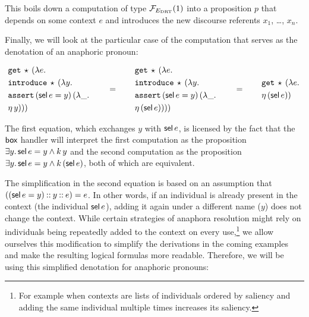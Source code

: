 This boils down a computation of type $\mathcal{F}_{E_{\mathrm{DRT}}}(1)$ into a proposition
$p$ that depends on some context $e$ and introduces the new discourse
referents $x_1$, \ldots, $x_n$.

Finally, we will look at the particular case of the computation that serves
as the denotation of an anaphoric pronoun:

$$
  \begin{aligned}
   &\mathtt{get}\,\star\,(\lambda e.\,  \\
   &\mathtt{introduce}\,\star\,(\lambda y.\,  \\
   &\mathtt{assert}\,(\textsf{sel}\,e = y)\,(\lambda \_.\,  \\
   &\eta\,y)))
   \end{aligned}
   \qquad = \qquad
   \begin{aligned}
   &\mathtt{get}\,\star\,(\lambda e.\,  \\
   &\mathtt{introduce}\,\star\,(\lambda y.\,  \\
   &\mathtt{assert}\,(\textsf{sel}\,e = y)\,(\lambda \_.\,  \\
   &\eta\,(\textsf{sel}\,e))))
   \end{aligned}
   \qquad = \qquad
   \begin{aligned}
   &\mathtt{get}\,\star\,(\lambda e.\,  \\
   &\eta\,(\textsf{sel}\,e))
   \end{aligned}
$$

The first equation, which exchanges $y$ with $\textsf{sel}\,e$, is licensed by
the fact that the $\textsf{box}$ handler will interpret the first computation as
the proposition $\exists y.\, \textsf{sel}\,e = y \land k\,y$ and the
second computation as the proposition
$\exists y.\, \textsf{sel}\,e = y \land k\,(\textsf{sel}\,e)$, both of which
are equivalent.

The simplification in the second equation is based on an assumption that
$((\textsf{sel}\,e = y) \mathbin{::} y \mathbin{::} e) = e$. In other words, if an
individual is already present in the context (the individual
$\textsf{sel}\,e$), adding it again under a different name ($y$) does not
change the context. While certain strategies of anaphora resolution might
rely on individuals being repeatedly added to the context on every
use,\footnote{For example when contexts are lists of individuals ordered by
  saliency and adding the same individual multiple times increases its
  saliency.} we allow ourselves this modification to simplify the
derivations in the coming examples and make the resulting logical formulas
more readable. Therefore, we will be using this simplified denotation for
anaphoric pronouns:

